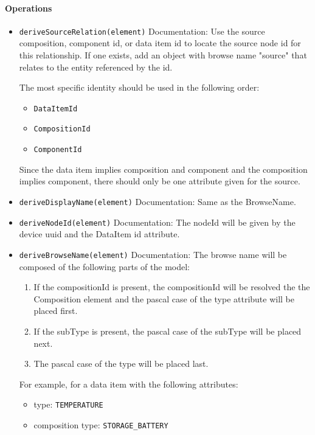 \paragraph{Operations}
\begin{itemize}
  \item \texttt{deriveSourceRelation(element)}
    Documentation: Use the source composition,  component id, or data item id to locate the source node id for this relationship. If one exists, add an object with  browse name "source" that relates to the entity referenced by the id. 

The most specific identity should be used in the following order:
\begin{itemize}
\item \texttt{DataItemId}
\item \texttt{CompositionId}
\item \texttt{ComponentId}
\end{itemize}

Since the data item implies composition and component and the composition implies component, there should only be one attribute given for the source.

  \item \texttt{deriveDisplayName(element)}
    Documentation: Same as the BrowseName.

  \item \texttt{deriveNodeId(element)}
    Documentation: The nodeId will be given by the device uuid and the DataItem id attribute.

  \item \texttt{deriveBrowseName(element)}
    Documentation: The browse name will be composed of the following parts of the model:

\begin{enumerate}
\item If the compositionId is present, the compositionId will be resolved the the Composition element and the pascal case of the type attribute will be placed first.
\item If the subType is present, the pascal case of the subType will be placed next.
\item The pascal case of the type will be placed last.
\end{enumerate}

For example, for a data item with the following attributes:

\begin{itemize}
\item type: \texttt{TEMPERATURE}
\item composition type: \texttt{STORAGE_BATTERY}
\end{itemize}


\end{itemize}
